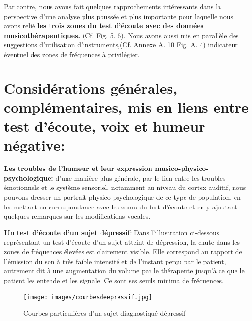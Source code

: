 Par contre, nous avons fait quelques rapprochements intéressants dans la perspective d'une analyse plus
poussée et plus importante pour laquelle nous avons  relié\textbf{ les trois zones du
test d'écoute avec des données musicothérapeutiques.}
(Cf. Fig. 5. 6).
Nous avons aussi mis
en parallèle des suggestions d'utilisation d'instruments,(Cf. Annexe A. 10 Fig. A. 4)
indicateur éventuel des zones de fréquences à
privilégier.




   





                    \section{Considérations générales, complémentaires, mis en liens entre test d'écoute, voix et humeur négative:}


                  \textbf{Les troubles de l'humeur et leur expression
                  musico-phy\-sico-psy\-cho\-lo\-gi\-que:}
                  d'une manière plus générale, par le lien entre les troubles
                  émotionnels et le
                  système sensoriel, notamment au niveau du cortex auditif, nous
                  pouvons dresser un portrait
                  physico-psychologique de ce type de population,
                  en les mettant en correspondance avec les zones du test d'écoute et
                  en y ajoutant quelques remarques sur les modifications vocales.

                  \textbf{Un test d'écoute d'un sujet dépressif}:
                  Dans l'illustration ci-dessous représentant un test
                  d'écoute d'un sujet atteint de dépression, la
                  chute dans les zones de fréquences élevées est
                  clairement visible. Elle correspond au rapport de l'émission du son à
                  très faible intensité et de
                  l'instant perçu par le
                  patient, autrement dit à une augmentation
                  du volume
                  par le thérapeute jusqu'à ce que le patient les entende et les signale.
                  Ce sont ses seuils minima de fréquences.
                  \begin{figure}[ht]
                  \centering
                  \texttt{[image: images/courbesdeepressif.jpg]}
                  \caption{Courbes particulières d'un sujet diagnostiqué dépressif}
                  \label{fig:courbes du dépressif}
                    \end{figure}


